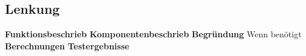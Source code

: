 \subsection{Lenkung}

\textbf{Funktionsbeschrieb}
\textbf{Komponentenbeschrieb}
\textbf{Begründung}
Wenn benötigt
\textbf{Berechnungen}
\textbf{Testergebnisse}